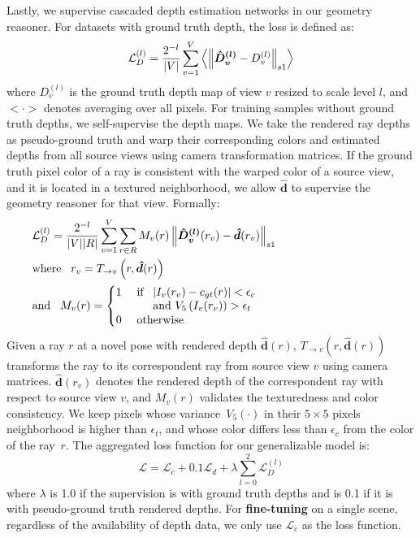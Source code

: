 Lastly, we supervise cascaded depth estimation networks in our geometry reasoner. For datasets with ground truth depth, the loss is defined as:
\begin{equation}
    \mathcal{L}^{(l)}_{D} = \frac{2^{- l}}{|V|} \sum_{v=1}^{V} \left < \left\lVert \boldsymbol{\hat{D}^{(l)}_{v}} - D^{(l)}_{v}\right\rVert_{s1} \right >
\end{equation}
where $D^{(l)}_{v}$ is the ground truth depth map of view $v$ resized to scale level $l$, and $< \cdot >$ denotes averaging over all pixels. For training samples without ground truth depths, we self-supervise the depth maps. We take the rendered ray depths as pseudo-ground truth and warp their corresponding colors and estimated depths from all source views using camera transformation matrices. If the ground truth pixel color of a ray is consistent with the warped color of a source view, and it is located in a textured neighborhood, we allow $\boldsymbol{\hat{d}}$ to supervise the geometry reasoner for that view. Formally:
\begin{align}
        & \mathcal{L}^{(l)}_{D} = \frac{2^{- l}}{|V||R|} \sum_{v=1}^{V} \sum_{r \in R} M_{v}(r) \norm{ \boldsymbol{\hat{D}^{(l)}_{v}}(r_v) - \boldsymbol{\hat{d}}(r_v)}_{s1} \notag
        \\
        & \text{where } \phantom{0} r_{v} = T_{\rightarrow v}\left(r, \boldsymbol{\hat{d}}(r)\right)
        \\
        & \text{and } \phantom{0} M_{v}(r) = 
        \begin{cases} 
            1 & \text{ if } \phantom{0}
            \parbox[t]{0.6\linewidth}{
                $\abs{ I_{v}(r_v) - c_{gt}(r)} < \epsilon_c $\\
                and $V_5 \left( I_{v}(r_v) \right) > \epsilon_t$
            }
            \\
            0 & \text{ otherwise }
        \end{cases} \notag
\end{align}
Given a ray $r$ at a novel pose with rendered depth $\boldsymbol{\hat{d}}(r)$, $T_{\rightarrow v}\left(r, \boldsymbol{\hat{d}}(r)\right)$ transforms the ray to its correspondent ray from source view $v$ using camera matrices. $\boldsymbol{\hat{d}}(r_v)$ denotes the rendered depth of the correspondent ray with respect to source view $v$, and $M_{v}(r)$ validates the texturedness and color consistency. We keep pixels whose variance~$V_5(\cdot)$ in their $5 \times 5$ pixels neighborhood is higher than $\epsilon_t$, and whose color differs less than $\epsilon_c$ from the color of the ray~$r$. The aggregated loss function for our generalizable model is:
\begin{equation}
    \mathcal{L} = \mathcal{L}_{c} + 0.1 \mathcal{L}_{d} + \lambda \sum_{l=0}^{2}\mathcal{L}^{(l)}_{D}
\end{equation}
where $\lambda$ is 1.0 if the supervision is with ground truth depths and is 0.1 if it is with pseudo-ground truth rendered depths. For \textbf{fine-tuning} on a single scene, regardless of the availability of depth data, we only use $\mathcal{L}_{c}$ as the loss function.

